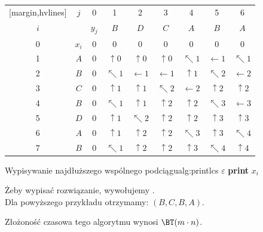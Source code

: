 \begin{table}[H]
	\centering
	\renewcommand{\arraystretch}{1.2}
	\begin{NiceTabular}{cc|c|cccccc}[margin,hvlines]
		& $j$ & 0 & 1 & 2 & 3 & 4 & 5 & 6 \\
		$i$ & & $y_j$ & $B$ & $D$ & $C$ & $A$ & $B$ & $A$ \\
		 & $x_i$ & 0 & 0 & 0 & 0 & 0 & 0 & 0 \\
		1 & $A$   & 0 & $\uparrow 0$ & $\uparrow 0$ & $\uparrow 0$ & $\nwarrow 1$ & $\leftarrow 1$ & $\nwarrow 1$ \\
		2 & $B$   & 0 & $\nwarrow 1$ & $\leftarrow 1$ & $\leftarrow 1$ & $\uparrow 1$ & $\nwarrow 2$ & $\leftarrow 2$ \\
		3 & $C$   & 0 & $\uparrow 1$ & $\uparrow 1$ & $\nwarrow 2$ & $\leftarrow 2$ & $\uparrow 2$ & $\uparrow 2$ \\
		4 & $B$   & 0 & $\nwarrow 1$ & $\uparrow 1$ & $\uparrow 2$ & $\uparrow 2$ & $\nwarrow 3$ & $\leftarrow 3$ \\
		5 & $D$   & 0 & $\uparrow 1$ & $\nwarrow 2$ & $\uparrow 2$ & $\uparrow 2$ & $\uparrow 3$ & $\uparrow 3$ \\
		6 & $A$   & 0 & $\uparrow 1$ & $\uparrow 2$ & $\uparrow 2$ & $\nwarrow 3$ & $\uparrow 3$ & $\nwarrow 4$ \\
		7 & $B$   & 0 & $\nwarrow 1$ & $\uparrow 2$ & $\uparrow 2$ & $\uparrow 3$ & $\nwarrow 4$ & $\uparrow 4$ \\
	\end{NiceTabular}
\end{table}

\begin{alg}{Wypisywanie najdłuższego wspólnego podciągu}{alg:printlcs}
	\State \Return $\varepsilon$ 
	\EndIf
	\State {}
	\State \textbf{print} $x_i$
	\State {}
	\Else
	\State {}
	\EndIf
	\EndFunction
\end{alg}

Żeby wypisać rozwiązanie, wywołujemy . \\
Dla powyższego przykładu otrzymamy: $(B, C, B, A)$.

Złożoność czasowa tego algorytmu wynosi $\BT(m \cdot n)$.
